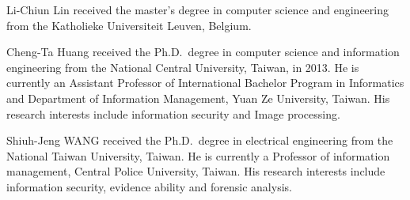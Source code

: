 \documentclass[journal]{IEEEtran}
\begin{document}
	
	
	\begin{IEEEbiographynophoto}{Li-Chiun Lin}
		received the master's degree in computer science and engineering from the Katholieke Universiteit Leuven, Belgium.
	\end{IEEEbiographynophoto}
	
	\begin{IEEEbiographynophoto}{Cheng-Ta Huang}
		received the Ph.D.~degree in computer science and information engineering from the National Central University, Taiwan, in 2013. 
		He is currently an Assistant Professor of International Bachelor Program in Informatics and Department of Information Management, Yuan Ze University, Taiwan. His research interests include information security and Image processing.
	\end{IEEEbiographynophoto}
	
	\begin{IEEEbiographynophoto}{Shiuh-Jeng WANG}
		received the Ph.D.~degree in electrical engineering from the National Taiwan University, Taiwan. He is currently a Professor of information management, Central Police University, Taiwan. His research interests include information security, evidence ability and forensic analysis.
		
	\end{IEEEbiographynophoto}
	
\end{document}
